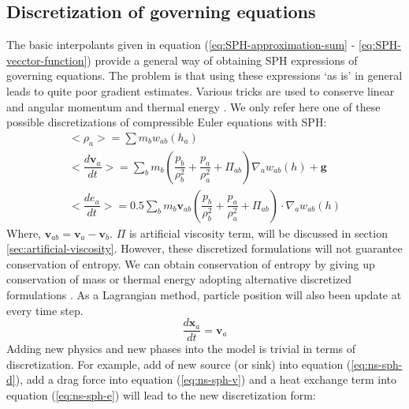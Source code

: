\documentclass[10pt,a4paper]{article}
\begin{document}
\subsection{Discretization of governing equations}
The basic interpolants given in equation (\ref{eq:SPH-approximation-sum} - \ref{eq:SPH-vecctor-function}) provide a general way of obtaining SPH expressions of governing equations. The problem is that using these expressions ‘as is’ in general leads to quite poor gradient estimates. Various tricks are used to conserve linear and angular momentum and thermal energy \citep{monaghan1992smoothed}. We only refer here one of these possible discretizations of compressible Euler equations with SPH:
\begin{eqnarray}
<\rho_a> = \sum m_b w_{ab} (h_a) \label{eq:ns-sph-d} \\
<\dfrac{d \textbf{v}_a}{d t}>= \sum_b m_b (\dfrac{p_b}{\rho_b^2} + \dfrac{p_a}{\rho_a^2} + \Pi_{ab}) \nabla_a w_{a b}(h) +\textbf{g} \label{eq:ns-sph-v} \\
<\dfrac{d e_a}{d t}>=
 0.5\sum_b m_b \textbf{v}_{a b}(\dfrac{p_b}{\rho_b^2} + \dfrac{p_a}{\rho_a^2} + \Pi_{ab}) \cdot \nabla_a w_{a b}(h) \label{eq:ns-sph-e}
\end{eqnarray}
Where, $\textbf{v}_{a b} = \textbf{v}_a - \textbf{v}_b$. $\Pi$ is artificial viscosity term, will be discussed in section \ref{sec:artificial-viscosity}.
However, these discretized formulations will not guarantee conservation of entropy. We can obtain conservation of entropy by giving up conservation of mass or thermal energy adopting alternative discretized formulations \citep{monaghan1992smoothed}. 
As a Lagrangian method, particle position will also been update at every time step.
\begin{equation}
\dfrac{d \textbf{x}_a}{dt} = \textbf{v}_a \label{eq:SPH-update-pos}
\end{equation}
Adding new physics and new phases into the model is trivial in terms of discretization. For example, add of new source (or sink) into equation (\ref{eq:ns-sph-d}), add a drag force into equation (\ref{eq:ns-sph-v})  and a heat exchange term into equation (\ref{eq:ns-sph-e}) will lead to the new discretization form:
\end{document}
